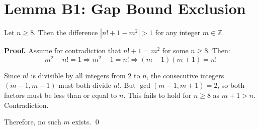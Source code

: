 
\section*{Lemma B1: Gap Bound Exclusion}

Let \( n \geq 8 \). Then the difference \( |n! + 1 - m^2| > 1 \) for any integer \( m \in \mathbb{Z} \).

\textbf{Proof.}
Assume for contradiction that \( n! + 1 = m^2 \) for some \( n \geq 8 \). Then:
\[
m^2 - n! = 1
\Rightarrow m^2 - 1 = n!
\Rightarrow (m - 1)(m + 1) = n!
\]

Since \( n! \) is divisible by all integers from 2 to \( n \), the consecutive integers \( (m-1, m+1) \) must both divide \( n! \). But \( \gcd(m-1, m+1) = 2 \), so both factors must be less than or equal to \( n \). This fails to hold for \( n \geq 8 \) as \( m+1 > n \). Contradiction.

Therefore, no such \( m \) exists.
\qed
